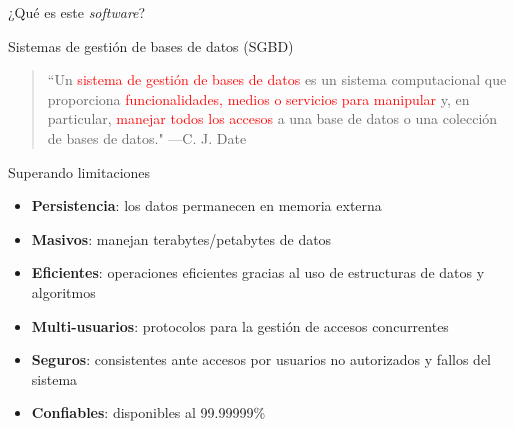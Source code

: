 \begin{frame}{¿Qu\'e es este \textit{software}?}



    \begin{block}{Sistemas de gesti\'on de bases de datos (SGBD)}
        \begin{quote}
            ``Un \textcolor{red}{sistema de gesti\'on de bases de datos}
            es un sistema computacional que proporciona
            \textcolor{red}{funcionalidades, medios o servicios para manipular} y, en particular,
            \textcolor{red}{manejar todos los accesos} a una base de datos o una colecci\'on
            de bases de datos." \hspace{1em plus 1fill}---C. J. Date
        \end{quote}
    \end{block}
\end{frame}


\begin{frame}{Superando limitaciones}
       
            \begin{block}{}
                \begin{itemize}
                    \item<1-> \textbf{Persistencia}: los datos permanecen en memoria externa
                    \item<2-> \textbf{Masivos}: manejan terabytes/petabytes de datos
                    \item<3-> \textbf{Eficientes}: operaciones eficientes gracias al uso de estructuras de datos y algoritmos
                    \item<4-> \textbf{Multi-usuarios}: protocolos para la gesti\'on de accesos concurrentes
                    \item<5-> \textbf{Seguros}: consistentes ante accesos por usuarios no autorizados y fallos del sistema
                    \item<6-> \textbf{Confiables}: disponibles al 99.99999\%
                \end{itemize}
            \end{block}
               
\end{frame}


